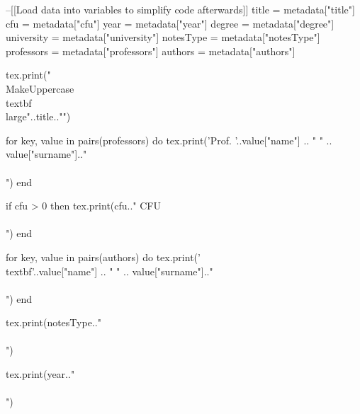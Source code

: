 \ifLuaTeX
\begin{luacode}
--[[Load data into variables to simplify code afterwards]]
title = metadata["title"]
cfu = metadata["cfu"]
year = metadata["year"]
degree = metadata["degree"]
university = metadata["university"]
notesType = metadata["notesType"]
professors = metadata["professors"]
authors = metadata["authors"]
\end{luacode}


\begin{titlepage}
\begin{center}
\vspace*{1em}
\begin{luacode}
		tex.print("\\MakeUppercase{\\textbf{\\large{"..title.."}}}")
\end{luacode}

\vspace{1em}

\begin{luacode}
		for key, value in pairs(professors) do
			 tex.print('Prof. '..value["name"] .. " " .. value["surname"].."\\\\")
		end
\end{luacode}
\begin{luacode}
	if cfu > 0 then
		tex.print(cfu.." CFU\\\\")
	end
\end{luacode}

\vspace{1em}

\begin{luacode}
		for key, value in pairs(authors) do
			 tex.print('\\textbf{'..value["name"] .. " " .. value["surname"].."}\\\\")
		end
\end{luacode}
                
\vfill
        
\begin{luacode}
		tex.print(notesType.."\\\\")
\end{luacode}
\begin{luacode}
		tex.print(year.."\\\\")
\end{luacode}


\end{center}
\end{titlepage}
